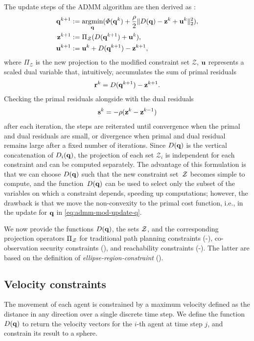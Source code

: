 \documentclass[journal]{IEEEtran}  %
\begin{document}
The update steps of the ADMM algorithm are then derived as \cite{Boyd2011}:
\begin{subequations}\label{eq:ADMMupdate}
	\begin{align}
		\label{eq:admm-mod-update-q}\mathbf{q}^{k+1}&:=\operatorname*{\arg\!\min}_{\mathbf{q}}(\varPhi(\mathbf{q}^k) +\frac{\rho}{2}\lVert D(\mathbf{q})-\mathbf{z}^k+\mathbf{u}^k\rVert_2^2),\\
		\mathbf{z}^{k+1}&:=\Pi_\mathcal{Z}(D(\mathbf{q}^{k+1})+\mathbf{u}^k), \\
		\mathbf{u}^{k+1}&:=\mathbf{u}^k+D(\mathbf{q}^{k+1})-\mathbf{z}^{k+1},
	\end{align}
\end{subequations}
where $\Pi_\mathcal{Z}$ is the new projection to the modified constraint set $\mathcal{Z}$, $\mathbf{u}$ represents a scaled dual variable that, intuitively, accumulates the sum of primal residuals
\begin{equation}\label{eq:primal-residual}
	\mathbf{r}^{k}=D(\mathbf{q}^{k+1})-\mathbf{z}^{k+1}.
\end{equation}
Checking the primal residuals alongside with the dual residuals 
\begin{equation}\label{eq:dual-residual}
	\mathbf{s}^{k}=-\rho(\mathbf{z}^{k}-\mathbf{z}^{k-1})
\end{equation}
after each iteration, the steps are reiterated until convergence when the primal and dual residuals are small, or divergence when primal and dual residual remains large after a fixed number of iterations.
Since $D(\mathbf{q})$ is the vertical concatenation of $D_i(\mathbf{q})$, the projection of each set $\mathcal{Z}_i$ is independent for each constraint and can be computed separately. The advantage of this formulation is that we can choose $D(\mathbf{q})$ such that the new constraint set~$\mathcal{Z}$ becomes simple to compute, and the function~$D(\mathbf{q})$ can be used to select only the subset of the variables on which a constraint depends, speeding up computations; however, the drawback is that we move the non-convexity to the primal cost function, i.e., in the update for $\mathbf{q}$ in \eqref{eq:admm-mod-update-q}.

We now provide the functions $D(\mathbf{q})$, the sets $\mathcal{Z}$, and the corresponding projection operators $\Pi_{\mathcal{Z}}$ for traditional path planning constraints (-), co-observation security constraints (), and reachability constraints (-). The latter are based on the definition of \emph{ellipse-region-constraint} ().

\subsection{Velocity constraints}\label{sec:velocity-constraint}
  The movement of each agent is constrained by a maximum velocity defined as the distance in any direction over a single discrete time step. We define the function $D(\mathbf{q})$ to return the velocity vectors for the $i$-th agent at time step $j$, and constrain its result to a sphere.
\end{document}
